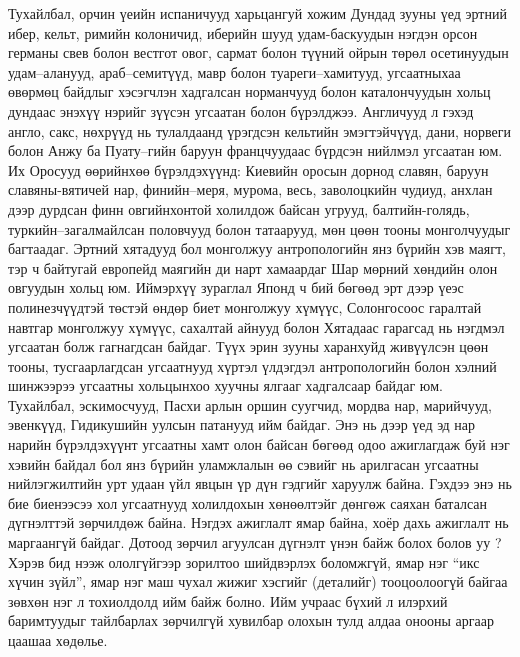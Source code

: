 Тухайлбал, орчин үеийн испаничууд харьцангуй хожим Дундад зууны үед эртний ибер, кельт, римийн колоничид, иберийн шууд удам-баскуудын нэгдэн орсон германы свев болон вестгот овог, сармат болон түүний ойрын төрөл осетинуудын удам–аланууд, араб–семитүүд, мавр болон туареги–хамитууд, угсаатныхаа өвөрмөц байдлыг хэсэгчлэн хадгалсан норманчууд болон каталончуудын хольц дундаас энэхүү нэрийг зүүсэн угсаатан болон бүрэлджээ.
Англичууд л гэхэд англо, сакс, нөхрүүд нь тулалдаанд үрэгдсэн кельтийн эмэгтэйчүүд, дани, норвеги болон Анжу ба Пуату–гийн баруун францчуудаас бүрдсэн нийлмэл угсаатан юм.
Их Оросууд өөрийнхөө бүрэлдэхүүнд: Киевийн оросын дорнод славян, баруун славяны-вятичей нар, финийн–меря, мурома, весь, заволоцкийн чудиуд, анхлан дээр дурдсан финн овгийнхонтой холилдож байсан угрууд, балтийн-голядь, туркийн–загалмайлсан половчууд болон татаарууд, мөн цөөн тооны монголчуудыг багтаадаг.
Эртний хятадууд бол монголжуу антропологийн янз бүрийн хэв маягт, тэр ч байтугай европейд маягийн ди нарт хамаардаг Шар мөрний хөндийн олон овгуудын хольц юм. Иймэрхүү зураглал Японд ч бий бөгөөд эрт дээр үеэс полинезчүүдтэй төстэй өндөр биет монголжуу хүмүүс, Солонгосоос гаралтай навтгар монголжуу хүмүүс, сахалтай айнууд болон Хятадаас гарагсад нь нэгдмэл угсаатан болж гагнагдсан байдаг.
Түүх эрин зууны харанхуйд живүүлсэн цөөн тооны, тусгаарлагдсан угсаатнууд хүртэл үлдэгдэл антропологийн болон хэлний шинжээрээ угсаатны хольцынхоо хуучны ялгааг хадгалсаар байдаг юм. Тухайлбал, эскимосчууд, Пасхи арлын оршин суугчид, мордва нар, марийчууд, эвенкүүд, Гидикушийн уулсын патанууд ийм байдаг. Энэ нь дээр үед эд нар нарийн бүрэлдэхүүнт угсаатны хамт олон байсан бөгөөд одоо ажиглагдаж буй нэг хэвийн байдал бол янз бүрийн уламжлалын өө сэвийг нь арилгасан угсаатны нийлэгжилтийн урт удаан үйл явцын үр дүн гэдгийг харуулж байна.
Гэхдээ энэ нь бие биенээсээ хол угсаатнууд холилдохын хөнөөлтэйг дөнгөж саяхан баталсан дүгнэлттэй зөрчилдөж байна. Нэгдэх ажиглалт ямар байна, хоёр дахь ажиглалт нь маргаангүй байдаг. Дотоод зөрчил агуулсан дүгнэлт үнэн байж болох болов уу ? Хэрэв бид нээж ололгүйгээр зорилтоо шийдвэрлэх боломжгүй, ямар нэг “икс хүчин зүйл”, ямар нэг маш чухал жижиг хэсгийг (деталийг) тооцоолоогүй байгаа зөвхөн нэг л тохиолдолд ийм байж болно. Ийм учраас бүхий л илэрхий баримтуудыг тайлбарлах зөрчилгүй хувилбар олохын тулд алдаа онооны аргаар цаашаа хөдөлье.
